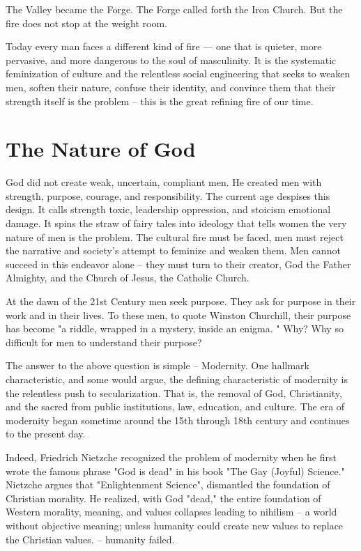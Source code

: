 \documentclass[12pt,a4paper]{book}
\begin{document}
The Valley became the Forge. The Forge called forth the Iron Church. But the fire does not stop at the weight room.

Today every man faces a different kind of fire — one that is quieter, more pervasive, and more dangerous to the soul of masculinity.  It is the systematic feminization of culture and the relentless social engineering that seeks to weaken men, soften their nature, confuse their identity, and convince them that their strength itself is the problem -- this is the great refining fire of our time. 

\section{The Nature of God}

God did not create weak, uncertain, compliant men. He created men with strength, purpose, courage, and responsibility. The current age despises this design. It calls strength toxic, leadership oppression, and stoicism emotional damage. It spins the straw of fairy tales into ideology that tells women the very nature of men is the problem.  The cultural fire must be faced, men must reject the narrative and society's attempt to feminize and weaken them.  Men cannot succeed in this endeavor alone -- they must turn to their creator, God the Father Almighty, and the Church of Jesus, the Catholic Church.

At the dawn of the 21st Century men seek purpose.  They ask for purpose in their work and in their lives.  To these men, to quote Winston Churchill, their purpose has become "a riddle,  wrapped in a mystery, inside an enigma. " Why?  Why so difficult for men to understand their purpose?

The answer to the above question is simple -- Modernity.  One hallmark characteristic, and some would argue, the defining characteristic of modernity is the relentless push to secularization.  That is,  the removal of God, Christianity, and the sacred from public institutions, law, education, and culture.  The era of modernity began sometime around the 15th through 18th century and continues to the present day. 

Indeed, Friedrich Nietzche recognized the problem of modernity when he first wrote the famous phrase "God is dead" in his book "The Gay (Joyful) Science."  Nietzche argues that "Enlightenment Science", dismantled the foundation of Christian morality.  He realized, with God "dead," the entire foundation of Western morality, meaning, and values collapses leading to nihilism -- a world without objective meaning; unless humanity could create new values to replace the Christian values.  -- humanity failed.
\end{document}
